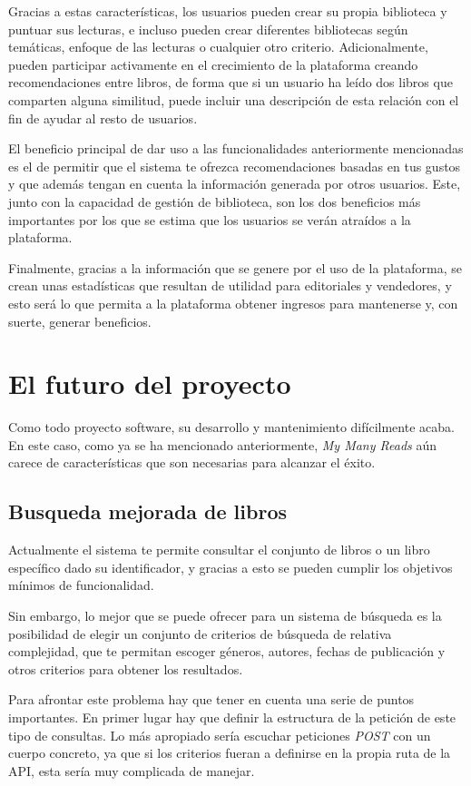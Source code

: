 Gracias a estas características, los usuarios pueden crear su propia biblioteca y puntuar sus lecturas, e incluso pueden crear diferentes bibliotecas según temáticas, enfoque de las lecturas o cualquier otro criterio. Adicionalmente, pueden participar activamente en el crecimiento de la plataforma creando recomendaciones entre libros, de forma que si un usuario ha leído dos libros que comparten alguna similitud, puede incluir una descripción de esta relación con el fin de ayudar al resto de usuarios.

El beneficio principal de dar uso a las funcionalidades anteriormente mencionadas es el de permitir que el sistema te ofrezca recomendaciones basadas en tus gustos y que además tengan en cuenta la información generada por otros usuarios. Este, junto con la capacidad de gestión de biblioteca, son los dos beneficios más importantes por los que se estima que los usuarios se verán atraídos a la plataforma.

Finalmente, gracias a la información que se genere por el uso de la plataforma, se crean unas estadísticas que resultan de utilidad para editoriales y vendedores, y esto será lo que permita a la plataforma obtener ingresos para mantenerse y, con suerte, generar beneficios.

\section{El futuro del proyecto}

Como todo proyecto software, su desarrollo y mantenimiento difícilmente acaba. En este caso, como ya se ha mencionado anteriormente, \textit{My Many Reads} aún carece de características que son necesarias para alcanzar el éxito.

\subsection{Busqueda mejorada de libros}

Actualmente el sistema te permite consultar el conjunto de libros o un libro específico dado su identificador, y gracias a esto se pueden cumplir los objetivos mínimos de funcionalidad.

Sin embargo, lo mejor que se puede ofrecer para un sistema de búsqueda es la posibilidad de elegir un conjunto de criterios de búsqueda de relativa complejidad, que te permitan escoger géneros, autores, fechas de publicación y otros criterios para obtener los resultados.

Para afrontar este problema hay que tener en cuenta una serie de puntos importantes. En primer lugar hay que definir la estructura de la petición de este tipo de consultas. Lo más apropiado sería escuchar peticiones \textit{POST} con un cuerpo concreto, ya que si los criterios fueran a definirse en la propia ruta de la API, esta sería muy complicada de manejar.

